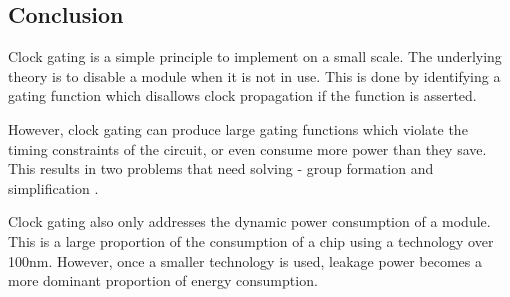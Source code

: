 \subsection{Conclusion}

Clock gating is a simple principle to implement on a small scale.
The underlying theory is to disable a module when it is not in use.
This is done by identifying a gating function which disallows clock propagation if the function is asserted.

However, clock gating can produce large gating functions which violate the timing constraints of the circuit, or even consume more power than they save. This results in two problems that need solving - group formation and simplification \cite{han2012synthesis, paik2012clock}.

Clock gating also only addresses the dynamic power consumption of a module. 
This is a large proportion of the consumption of a chip using a technology over 100nm. 
However, once a smaller technology is used, leakage power becomes a more dominant proportion of energy consumption. 





